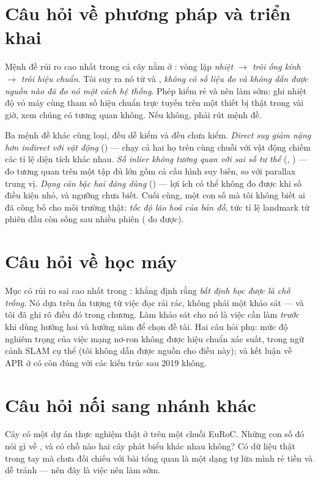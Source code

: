 \documentclass[vslam.tex]{subfiles}
\begin{document}
\section*{Câu hỏi về phương pháp và triển khai}

Mệnh đề rủi ro cao nhất trong cả cây nằm ở : vòng lặp \emph{nhiệt \(\rightarrow\) trôi ống kính \(\rightarrow\) trôi hiệu chuẩn}. Tôi suy ra nó từ  và , \emph{không có số liệu đo và không dẫn được nguồn nào đã đo nó một cách hệ thống}. Phép kiểm rẻ và nên làm sớm: ghi nhiệt độ vỏ máy cùng tham số hiệu chuẩn trực tuyến trên một thiết bị thật trong vài giờ, xem chúng có tương quan không. Nếu không, phải rút mệnh đề.

Ba mệnh đề khác cùng loại, đều dễ kiểm và đều chưa kiểm. \emph{Direct suy giảm nặng hơn indirect với vật động} () --- chạy cả hai họ trên cùng chuỗi với vật động chiếm các tỉ lệ diện tích khác nhau. \emph{Số inlier không tương quan với sai số tư thế} (, ) --- đo tương quan trên một tập đủ lớn gồm cả cấu hình suy biến, so với parallax trung vị. \emph{Dạng căn bậc hai đáng dùng} () --- lợi ích có thể không đo được khi số điều kiện nhỏ, và ngưỡng chưa biết. Cuối cùng, một con số mà tôi không biết ai đã công bố cho môi trường thật: \emph{tốc độ lão hoá của bản đồ}, tức tỉ lệ landmark từ phiên đầu còn sống sau nhiều phiên ( đo được).

\section*{Câu hỏi về học máy}

Mục có rủi ro sai cao nhất trong : khẳng định rằng \emph{bất định học được là chỗ trống}. Nó dựa trên ấn tượng từ việc đọc rải rác, không phải một khảo sát --- và tôi đã ghi rõ điều đó trong chương. Làm khảo sát cho nó là việc cần làm \emph{trước} khi dùng  hướng hai và hướng năm để chọn đề tài. Hai câu hỏi phụ: mức độ nghiêm trọng của việc mạng nơ-ron không được hiệu chuẩn xác suất, trong ngữ cảnh SLAM cụ thể (tôi không dẫn được nguồn cho điều này); và kết luận về APR ở  có còn đúng với các kiến trúc sau 2019 không.

\section*{Câu hỏi nối sang nhánh khác}

Cây  có một dự án thực nghiệm thật ở  trên một chuỗi EuRoC. Những con số đó nói gì về , và có chỗ nào hai cây phát biểu khác nhau không? Có dữ liệu thật trong tay mà chưa đối chiếu với bài tổng quan là một dạng tự lừa mình rẻ tiền và dễ tránh --- nên đây là việc nên làm sớm.
\end{document}
